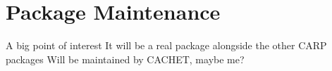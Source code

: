 \section{Package Maintenance}
A big point of interest
It will be a real package alongside the other CARP packages
Will be maintained by CACHET, maybe me?
